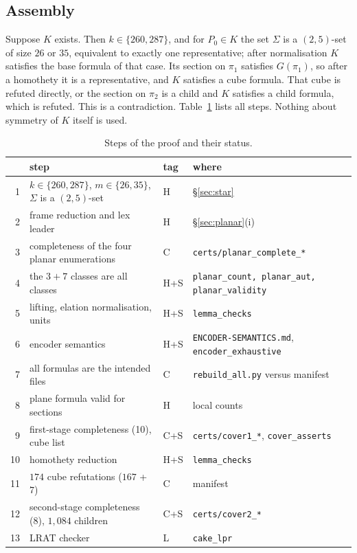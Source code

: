 \documentclass[11pt]{article}
\theoremstyle{plain}
\theoremstyle{remark}
\newcommand{\file}[1]{\texttt{#1}}
\begin{document}
\subsection{Assembly}
Suppose $K$ exists.
Then $k\in\{260,287\}$, and for $P_0\in K$ the set $\Sigma$ is a $(2,5)$-set of size $26$ or $35$, equivalent to exactly one representative; after normalisation $K$ satisfies the base formula of that case.
Its section on $\pi_1$ satisfies $G(\pi_1)$, so after a homothety it is a representative, and $K$ satisfies a cube formula.
That cube is refuted directly, or the section on $\pi_2$ is a child and $K$ satisfies a child formula, which is refuted.
This is a contradiction.
Table~\ref{tab:steps} lists all steps.
Nothing about symmetry of $K$ itself is used.

\begin{table}[!htb]
\centering\small
\begin{tabular}{@{}rlll@{}}
\toprule
 & step & tag & where \\
\midrule
1 & $k\in\{260,287\}$, $m\in\{26,35\}$, $\Sigma$ is a $(2,5)$-set & H & \S\ref{sec:star} \\
2 & frame reduction and lex leader & H & \S\ref{sec:planar}(i) \\
3 & completeness of the four planar enumerations & C & \file{certs/planar\_complete\_*} \\
4 & the $3+7$ classes are all classes & H+S & \file{planar\_count, planar\_aut, planar\_validity} \\
5 & lifting, elation normalisation, units & H+S & \file{lemma\_checks} \\
6 & encoder semantics & H+S & \file{ENCODER-SEMANTICS.md}, \file{encoder\_exhaustive} \\
7 & all formulas are the intended files & C & \file{rebuild\_all.py} versus manifest \\
8 & plane formula valid for sections & H & local counts \\
9 & first-stage completeness (10), cube list & C+S & \file{certs/cover1\_*}, \file{cover\_asserts} \\
10 & homothety reduction & H+S & \file{lemma\_checks} \\
11 & $174$ cube refutations ($167$ + $7$) & C & manifest \\
12 & second-stage completeness (8), $1{,}084$ children & C+S & \file{certs/cover2\_*} \\
13 & LRAT checker & L & \texttt{cake\_lpr} \cite{TanHM} \\
\bottomrule
\end{tabular}
\caption{Steps of the proof and their status.}\label{tab:steps}
\end{table}
\end{document}
